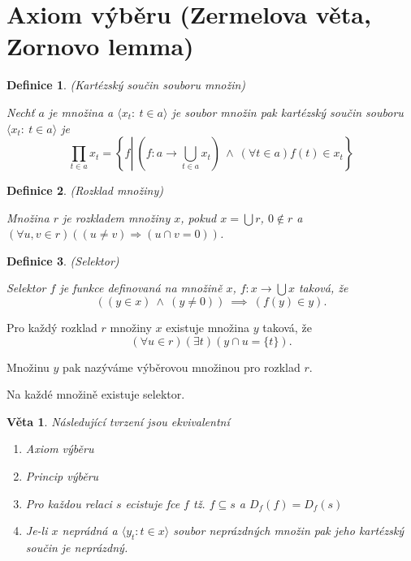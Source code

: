 \documentclass[a4paper,10pt,titlepage]{article} \usepackage[utf8]{inputenc}
\newtheorem{theorem}{Věta}
\newtheorem{define}{Definice}
\begin{document}
\section {Axiom výběru (Zermelova věta, Zornovo lemma)}

\begin{define}
(Kartézský součin souboru množin)

Nechť $a$ je množina a $\langle  x_t :\ t\in a\rangle$ je soubor množin pak kartézský součin souboru $\langle x_t :\ t\in a\rangle$ je
\[
	\prod_{t \in a} x_t = \left\{f \left| \ \left(f:a \rightarrow \bigcup_{t \in a} x_t\right) \ 
	\wedge \ \left(\forall t \in a\right) f(t) \in x_t \right. \right\} 
\]
\end{define}

\begin{define}
(Rozklad množiny)

Množina $r$ je rozkladem množiny $x$, pokud $x = \bigcup r$, $0 \notin r$ a $(\forall u,v \in r)((u \neq v) \Rightarrow (u \cap v = 0))$.
\end{define}

\begin{define}
(Selektor)

Selektor $f$ je funkce definovaná na množině $x$, $f: x \rightarrow \bigcup x$ taková, že
\[
	((y \in x) \ \wedge \ (y\neq 0)) \ \implies\ (f(y) \in y).
\]
\end{define}

\medskip
{}

Pro každý rozklad $r$ množiny $x$ existuje množina $y$ taková, že
\[
	(\forall u \in r) (\exists t) ( y \cap u = \{t\}).
\]

Množinu $y$ pak nazýváme výběrovou množinou pro rozklad $r$.

\medskip
{}

Na každé množině existuje selektor.

\medskip

\begin{theorem}
Následující tvrzení jsou ekvivalentní
\begin{enumerate}
\item Axiom výběru
\item Princip výběru
\item Pro každou relaci $s$ ecistuje fce $f$ tž. $f \subseteq s$ a $D_f(f) = D_f(s)$
\item Je-li $x$ neprádná a $\langle y_t : t \in x \rangle$ soubor neprázdných množin pak jeho kartézský součin je neprázdný.
\end{enumerate}
\end{theorem}
\end{document}
